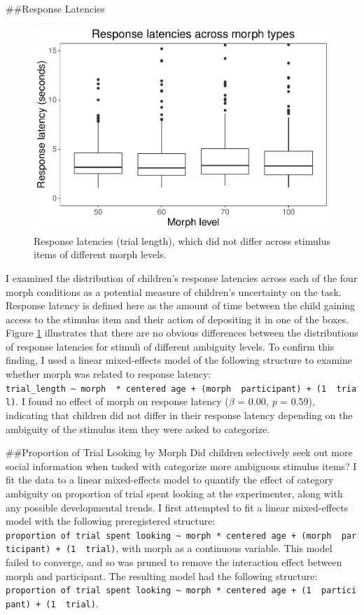 \documentclass[,man,floatsintext]{apa6}
\begin{document}
\#\#Response Latencies

\begin{figure}
\centering
\includegraphics{soc_ref_category_paper_files/figure-latex/latencies-1.pdf}
\caption{\label{fig:latencies}Response latencies (trial length), which did not differ across stimulus items of different morph levels.}
\end{figure}

I examined the distribution of children's response latencies across each of the four morph conditions as a potential measure of children's uncertainty on the task. Response latency is defined here as the amount of time between the child gaining access to the stimulus item and their action of depositing it in one of the boxes. Figure \ref{fig:latencies} illustrates that there are no obvious differences between the distributions of response latencies for stimuli of different ambiguity levels. To confirm this finding, I used a linear mixed-effects model of the following structure to examine whether morph was related to response latency: \texttt{trial\_length\ \textasciitilde{}\ morph\ \ *\ centered\ age\ +\ (morph\ \textbar{}\ participant)\ +\ (1\ \textbar{}\ trial)}. I found no effect of morph on response latency (\(\beta\) = 0.00, \emph{p} = 0.59), indicating that children did not differ in their response latency depending on the ambiguity of the stimulus item they were asked to categorize.

\#\#Proportion of Trial Looking by Morph
Did children selectively seek out more social information when tasked with categorize more ambiguous stimulus items? I fit the data to a linear mixed-effects model to quantify the effect of category ambiguity on proportion of trial spent looking at the experimenter, along with any possible developmental trends. I first attempted to fit a linear mixed-effects model with the following preregistered structure: \texttt{proportion\ of\ trial\ spent\ looking\ \textasciitilde{}\ morph\ *\ centered\ age\ +\ (morph\ \textbar{}\ participant)\ +\ (1\ \textbar{}\ trial)}, with morph as a continuous variable. This model failed to converge, and so was pruned to remove the interaction effect between morph and participant. The resulting model had the following structure: \texttt{proportion\ of\ trial\ spent\ looking\ \textasciitilde{}\ morph\ *\ centered\ age\ +\ (1\ \textbar{}\ participant)\ +\ (1\ \textbar{}\ trial)}.
\end{document}
